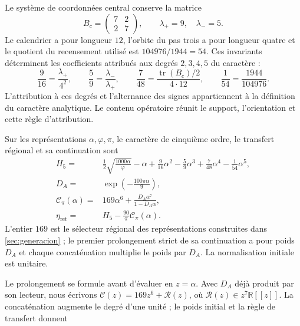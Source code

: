 Le système de coordonnées central conserve la matrice
\[
 B_c=\begin{pmatrix}7&2\\2&7\end{pmatrix},
 \qquad\lambda_+=9,\quad\lambda_-=5.
\]
Le calendrier a pour longueur \(12\), l’orbite du pas trois a pour
longueur quatre et le quotient du recensement utilisé est
\(104976/1944=54\). Ces invariants déterminent les coefficients
attribués aux degrés \(2,3,4,5\) du caractère :
\begin{equation}
 \frac9{16}=\frac{\lambda_+}{4^2},\qquad
 \frac59=\frac{\lambda_-}{\lambda_+},\qquad
 \frac7{48}=\frac{\operatorname{tr}(B_c)/2}{4\cdot12},
 \qquad
 \frac1{54}=\frac{1944}{104976}.
 \label{iv:action:coeficientes}
\end{equation}
L’attribution à ces degrés et l’alternance des signes appartiennent
à la définition du caractère analytique. Le contenu opératoire
réunit le support, l’orientation et cette règle d’attribution.

\begin{definition}
\label{iv:action:lectores}
Sur les représentations \(\alpha,\varphi,\pi\), le caractère de
cinquième ordre, le transfert régional et sa continuation sont
\begin{align}
 H_5={}&\frac12\sqrt{\frac{1000\alpha}{\varphi}}-\alpha
       +\frac9{16}\alpha^2-\frac59\alpha^3
       +\frac7{48}\alpha^4-\frac1{54}\alpha^5,
       \label{iv:action:h5}\\
 D_A={}&\exp\!\left(-\frac{100\pi\alpha}{9}\right),
       \label{iv:action:da}\\
 \mathcal C_\pi(\alpha)={}&169\alpha^6+
       \frac{D_A\alpha^7}{1-D_A\alpha},
       \label{iv:action:cpi}\\
 \eta_{\mathrm{ret}}={}&H_5-\frac{90}{\pi}\mathcal C_\pi(\alpha).
       \label{iv:action:eta-ret}
\end{align}
L’entier \(169\) est le sélecteur régional des représentations
construites dans \ref{sec:generacion} ; le premier prolongement strict de sa continuation
a pour poids \(D_A\) et chaque concaténation multiplie le poids par
\(D_A\). La normalisation initiale est unitaire.
\end{definition}

Le prolongement se formule avant d’évaluer en \(z=\alpha\).
Avec \(D_A\) déjà produit par son lecteur, nous écrivons
\(\mathscr C(z)=169z^6+\mathscr R(z)\), où
\(\mathscr R(z)\in z^7\mathbb R[[z]]\).
La concaténation augmente le degré d’une unité ; le poids initial
et la règle de transfert donnent

